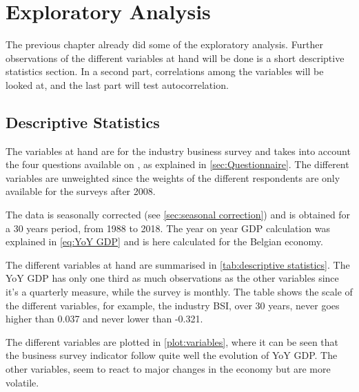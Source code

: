 \documentclass[12pt,a4paper,oneside]{book}
\begin{document}
\chapter{Exploratory Analysis}

The previous chapter already did some of the exploratory analysis.
Further observations of the different variables at hand will be done is a short descriptive statistics section.
In a second part, correlations among the variables will be looked at, and the last part will test autocorrelation.


\section{Descriptive Statistics}

The variables at hand are for the industry business survey and takes into account the four questions available on , as explained in \autoref{sec:Questionnaire}.
The different variables are unweighted since the weights of the different respondents are only available for the surveys after 2008.

The data is seasonally corrected (see \autoref{sec:seasonal correction}) and is obtained for a 30 years period, from 1988 to 2018.
The year on year GDP calculation was explained in \autoref{eq:YoY GDP} and is here calculated for the Belgian economy.

The different variables at hand are summarised in \autoref{tab:descriptive statistics}. The YoY GDP has only one third as much observations as the other variables since it's a quarterly measure, while the survey is monthly. 
The table shows the scale of the different variables, for example, the industry BSI, over 30 years, never goes higher than 0.037 and never lower than -0.321.

The different variables are plotted in \autoref{plot:variables}, where it can be seen that the business survey indicator follow quite well the evolution of YoY GDP. 
The other variables, seem to react to major changes in the economy but are more volatile. 
\end{document}

